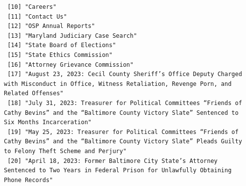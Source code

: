 \documentclass[
  letterpaper,
  DIV=11,
  numbers=noendperiod]{scrreprt}
\begin{document}
\begin{verbatim}
 [10] "Careers"                                                                                                                                                                                                                                             
 [11] "Contact Us"                                                                                                                                                                                                                                          
 [12] "OSP Annual Reports"                                                                                                                                                                                                                                  
 [13] "Maryland Judiciary Case Search"                                                                                                                                                                                                                      
 [14] "State Board of Elections"                                                                                                                                                                                                                            
 [15] "State Ethics Commission"                                                                                                                                                                                                                             
 [16] "Attorney Grievance Commission"                                                                                                                                                                                                                       
 [17] "August 23, 2023: Cecil County Sheriff’s Office Deputy Charged with Misconduct in Office, Witness Retaliation, Revenge Porn, and Related Offenses"                                                                                                    
 [18] "July 31, 2023: Treasurer for Political Committees “Friends of Cathy Bevins” and the “Baltimore County Victory Slate” Sentenced to Six Months Incarceration"                                                                                          
 [19] "May 25, 2023: Treasurer for Political Committees “Friends of Cathy Bevins” and the “Baltimore County Victory Slate” Pleads Guilty to Felony Theft Scheme and Perjury"                                                                                
 [20] "April 18, 2023: Former Baltimore City State’s Attorney Sentenced to Two Years in Federal Prison for Unlawfully Obtaining Phone Records"                                                                                                              

\end{verbatim}
\end{document}

